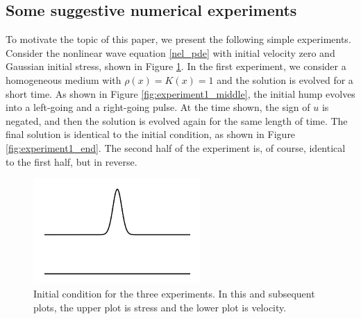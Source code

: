 \subsection{Some suggestive numerical experiments}
To motivate the topic of this paper, we present the following simple experiments.
Consider the nonlinear wave equation
\eqref{nel_pde} with initial velocity zero and Gaussian initial stress, 
shown in Figure \ref{fig:ic}.
In the first experiment, we consider a homogeneous medium with $\rho(x)=K(x)=1$ 
and the solution is evolved for a short time. %
As shown in Figure \ref{fig:experiment1_middle}, the initial 
hump evolves into a left-going
and a right-going pulse.  At the time shown, the sign of $u$ is negated,
and then the solution is evolved
again for the same length of time.%
The final solution is identical to the initial condition, as shown in Figure
\ref{fig:experiment1_end}.  The second half of the
experiment is, of course, identical to the first half, but in reverse.  

\begin{figure}
\centerline{
\includegraphics[width=2.5in]{figures/experiment1_ic.png}}
\caption{Initial condition for the three experiments.  In this and subsequent plots,
the upper plot is stress and the lower plot is velocity.\label{fig:ic}}
\end{figure}

